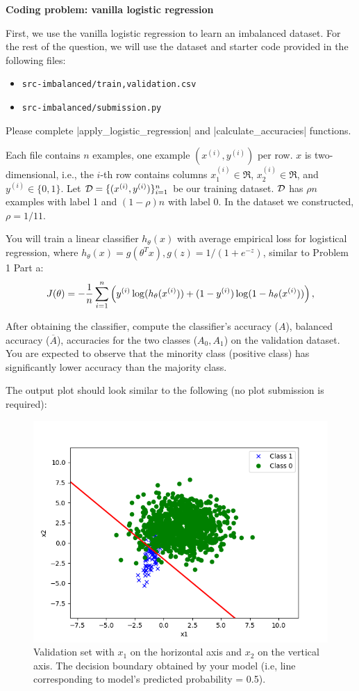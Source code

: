 \item {} \textbf{Coding problem: vanilla logistic regression}

First, we use the vanilla logistic regression to learn an imbalanced dataset. For the rest of the question, we will use the dataset and starter code provided in
the following files:
%
\begin{center}
	\begin{itemize}
		\item	\texttt{src-imbalanced/{train,validation}.csv}
		\item   \texttt{src-imbalanced/submission.py}
	\end{itemize}
\end{center}

Please complete |apply_logistic_regression| and |calculate_accuracies| functions.

Each file contains $n$ examples, one example $(x^{(i)}, y^{(i)})$ per row. $x$ is two-dimensional, i.e., the $i$-th row contains columns $x^{(i)}_1\in\Re$,
$x^{(i)}_2\in\Re$, and $y^{(i)}\in\{0, 1\}$. Let $\mathcal{D}=\{(x^{(i)}, y^{(i)})\}_{i=1}^n$ be our training dataset. $\mathcal{D}$ has $\rho n$ examples with label 1 and $(1-\rho)n$ with label 0. In the dataset we constructed, $\rho=1/11$.

You will train a linear classifier $h_{\theta}(x)$ with average empirical loss for logistical regression, where $h_\theta(x)=g(\theta^T x), g(z)=1/(1+e^{-z})$, similar to Problem 1 Part a:
\begin{align*}
J(\theta) = -\frac{1}{{n}} \sum_{i=1}^{n} \left(y^{(i)}\log(h_{\theta}(x^{(i)}))
+  (1 - y^{(i)})\log(1 - h_{\theta}(x^{(i)}))\right), 
\end{align*}

After obtaining the classifier, compute the classifier's accuracy ($A$), balanced accuracy ($\overline{A}$), accuracies for the two classes ($A_0, A_1$) on the validation dataset. You are expected to observe that the minority class (positive class) has significantly lower accuracy than the majority class. 

The output plot should look similar to the following (no plot submission is required):

\begin{figure}[H]
	\centering
	\vspace{2mm}
	\includegraphics[width=0.5\linewidth]{03-imbalanced/imbalanced_naive_pred.png}
	  \caption{Validation set with $x_1$ on the horizontal axis and $x_2$ on
	  the vertical axis. The decision boundary obtained by your model (i.e, line corresponding to model's predicted probability = 0.5).}
  \end{figure}
